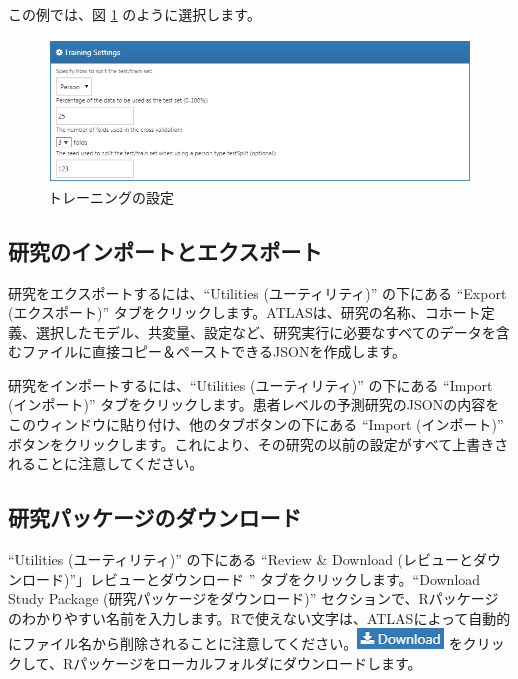 \documentclass[
  11pt]{book}
\theoremstyle{definition}
\theoremstyle{definition}
\theoremstyle{definition}
\theoremstyle{definition}
\theoremstyle{remark}
\begin{document}
この例では、図 \ref{fig:trainingSettings} のように選択します。

\begin{figure}

{\centering \includegraphics[width=1\linewidth]{images/PatientLevelPrediction/trainingSettings} 

}

\caption{トレーニングの設定}\label{fig:trainingSettings}
\end{figure}

\subsection{研究のインポートとエクスポート}\label{ux7814ux7a76ux306eux30a4ux30f3ux30ddux30fcux30c8ux3068ux30a8ux30afux30b9ux30ddux30fcux30c8}

研究をエクスポートするには、``Utilities (ユーティリティ)'' の下にある ``Export (エクスポート)'' タブをクリックします。ATLASは、研究の名称、コホート定義、選択したモデル、共変量、設定など、研究実行に必要なすべてのデータを含むファイルに直接コピー＆ペーストできるJSONを作成します。

研究をインポートするには、``Utilities (ユーティリティ)'' の下にある ``Import (インポート)'' タブをクリックします。患者レベルの予測研究のJSONの内容をこのウィンドウに貼り付け、他のタブボタンの下にある ``Import (インポート)'' ボタンをクリックします。これにより、その研究の以前の設定がすべて上書きされることに注意してください。

\subsection{研究パッケージのダウンロード}\label{ux7814ux7a76ux30d1ux30c3ux30b1ux30fcux30b8ux306eux30c0ux30a6ux30f3ux30edux30fcux30c9}

``Utilities (ユーティリティ)'' の下にある ``Review \& Download (レビューとダウンロード)''」レビューとダウンロード '' タブをクリックします。``Download Study Package (研究パッケージをダウンロード)'' セクションで、Rパッケージのわかりやすい名前を入力します。Rで使えない文字は、ATLASによって自動的にファイル名から削除されることに注意してください。\includegraphics{images/PatientLevelPrediction/download.png} をクリックして、Rパッケージをローカルフォルダにダウンロードします。
\end{document}
